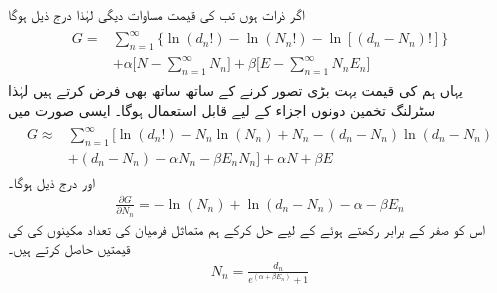 اگر ذرات  ہوں تب  کی قیمت مساوات  دیگی لہٰذا درج ذیل ہوگا 
\begin{gather}
\begin{aligned}
G =& \sum_{n = 1}^{\infty} \{ \ln(d_n !) - \ln(N_n !) - \ln[(d_n - N_n) !] \} \\
&+ \alpha \big [ N - \sum_{n = 1}^{\infty} N_n \big ] + \beta \big [ E - \sum_{n = 1}^{\infty} N_n E_n \big ]
\end{aligned}
\end{gather}
یہاں ہم  کی قیمت بہت بڑی تصور کرنے کے ساتھ ساتھ  بھی فرض کرتے ہیں لہٰذا سٹرلنگ تخمین دونوں اجزاء کے لیے قابل استعمال ہوگا۔ ایسی صورت میں 
\begin{gather}
\begin{aligned} 
G \approx & \sum_{n = 1}^{\infty} \big [ \ln(d_n !) - N_n \ln(N_n) + N_n - (d_n - N_n) \ln(d_n - N_n) \\
&+ (d_n - N_n) - \alpha N_n - \beta E_n N_n \big ] + \alpha N + \beta E
\end{aligned}
\end{gather}
اور درج ذیل ہوگا۔
\begin{align}
\frac{\partial G}{\partial N_n} = - \ln(N_n) + \ln(d_n - N_n) - \alpha - \beta E_n
\end{align}
اس کو صفر کے برابر رکھتے ہوئے  کے لیے حل کرکے ہم متماثل فرمیان کی تعداد مکینوں کی   کی قیمتیں حاصل کرتے ہیں۔
\begin{align}\label{مساوات_متماثل_سب_سے_زیادہ_محتمل_برائے_فرمیان}
N_n = \frac{d_n}{e^{(\alpha + \beta E_n)}+1}
\end{align}

